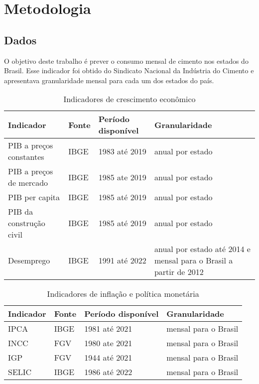 
\chapter{Metodologia}

\section{Dados}

O objetivo deste trabalho é prever o consumo mensal de cimento nos estados 
do Brasil. Esse indicador foi obtido do Sindicato Nacional da Indústria do 
Cimento e apresentava granularidade mensal para cada um dos estados do 
país.

\begin{table}
    \centering
    \caption{Indicadores de crescimento econômico}
    \begin{tabular}{llll}
        \toprule
        Indicador                   & Fonte & Período disponível & Granularidade         \\
        \midrule
        PIB a preços constantes     & IBGE  & 1983 até 2019      & anual por estado      \\
        PIB a preços de mercado     & IBGE  & 1985 ate 2019      & anual por estado      \\
        PIB per capita              & IBGE  & 1985 até 2019      & anual por estado      \\
        PIB da construção civil     & IBGE  & 1985 até 2019      & anual por estado      \\
        Desemprego                  & IBGE  & 1991 até 2022      & anual por estado até 2014 e mensal para o Brasil a partir de 2012      \\
        \bottomrule
    \end{tabular}
\end{table}

\begin{table}
    \centering
    \caption{Indicadores de inflação e política monetária}
    \begin{tabular}{llll}
        \toprule
        Indicador                   & Fonte & Período disponível & Granularidade         \\
        \midrule
        IPCA                        & IBGE  & 1981 até 2021      & mensal para o Brasil      \\
        INCC                        & FGV   & 1980 ate 2021      & mensal para o Brasil      \\
        IGP                         & FGV   & 1944 até 2021      & mensal para o Brasil      \\
        SELIC                       & IBGE  & 1986 até 2022      & mensal para o Brasil      \\
        \bottomrule
    \end{tabular}
\end{table}

